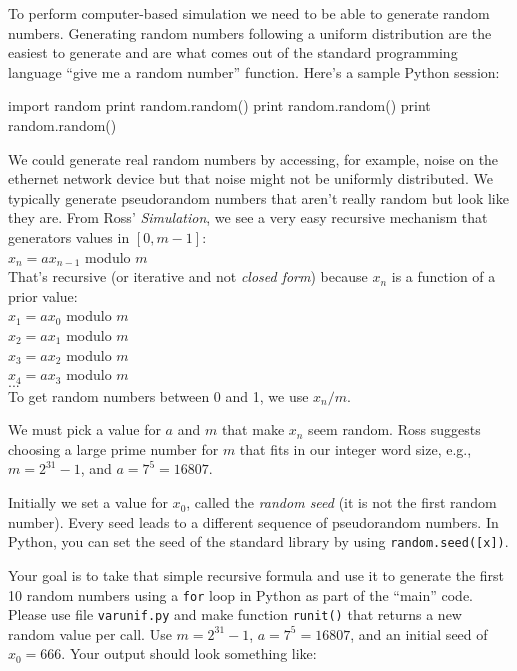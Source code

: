 \begin{fullwidth}

To perform computer-based simulation we need to be able to generate random numbers. Generating random numbers following a uniform distribution are the easiest to generate and are what comes out of the standard programming language ``give me a random number'' function.  Here's a sample Python session:

\begin{pyconsole}
import random
print random.random()
print random.random()
print random.random()
\end{pyconsole}

We could generate real random numbers by accessing, for example, noise on the ethernet network device but that noise might not be uniformly distributed. We typically generate pseudorandom numbers that aren't really random but look like they are. From Ross' {\em Simulation},  we see a very easy recursive mechanism that generators values in $[0,m-1]$:\\

$x_n = a x_{n-1}$ modulo $m$\\

That's recursive (or iterative and not {\em closed form}) because $x_n$ is a function of a prior value: \\

$x_1 = ax_0$ modulo $m$\\
$x_2 = ax_1$ modulo $m$\\
$x_3 = ax_2$ modulo $m$\\
$x_4 = ax_3$ modulo $m$\\
$...$\\

\noindent To get random numbers between 0 and 1, we use $x_n / m$.

We must pick a value for $a$ and $m$ that make $x_n$ seem random. Ross suggests choosing a large prime number for $m$ that fits in our integer word size, e.g., $m = 2^{31} - 1$, and $a = 7^5 = 16807$.

Initially we set a value for $x_0$, called the {\em random seed} (it is not the first random number). Every seed leads to a different sequence of pseudorandom numbers. In Python, you can set the seed of the standard library by using {\tt random.seed([x])}.

Your goal is to take that simple recursive formula and use it to generate the first 10 random numbers using a {\tt for} loop in Python as part of the ``main'' code. Please use file {\tt varunif.py} and make function {\tt runit()} that returns a new random value per call. Use $m = 2^{31} - 1$, $a = 7^5 = 16807$, and an initial seed of $x_0 = 666$.  Your output should look something like:


\end{fullwidth}
